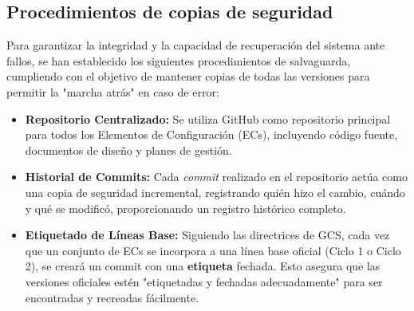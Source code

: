 \documentclass[11pt,a4paper]{article}
\begin{document}
\subsection{Procedimientos de copias de seguridad}

Para garantizar la integridad y la capacidad de recuperación del sistema ante fallos, se han establecido los siguientes procedimientos de salvaguarda, cumpliendo con el objetivo de mantener copias de todas las versiones para permitir la "marcha atrás" en caso de error:
\begin{itemize}
    \item \textbf{Repositorio Centralizado:} Se utiliza GitHub como repositorio principal para todos los Elementos de Configuración (ECs), incluyendo código fuente, documentos de diseño y planes de gestión.
    \item \textbf{Historial de Commits:} Cada \textit{commit} realizado en el repositorio actúa como una copia de seguridad incremental, registrando quién hizo el cambio, cuándo y qué se modificó, proporcionando un registro histórico completo.
    \item \textbf{Etiquetado de Líneas Base:} Siguiendo las directrices de GCS, cada vez que un conjunto de ECs se incorpora a una línea base oficial (Ciclo 1 o Ciclo 2), se creará un commit con una \textbf{etiqueta} fechada. Esto asegura que las versiones oficiales estén "etiquetadas y fechadas adecuadamente" para ser encontradas y recreadas fácilmente.
\end{itemize}
\end{document}
